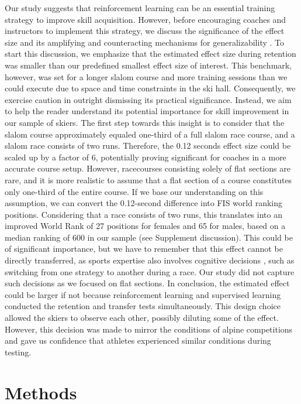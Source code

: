 \documentclass{article}
\begin{document}
Our study suggests that reinforcement learning can be an essential training strategy to improve skill acquisition. However, before encouraging coaches and instructors to implement this strategy, we discuss the significance of the effect size and its amplifying and counteracting mechanisms for generalizability \cite{anvari_not_2023}. To start this discussion, we emphasize that the estimated effect size during retention was smaller than our predefined smallest effect size of interest. This benchmark, however, was set for a longer slalom course and more training sessions than we could execute due to space and time constraints in the ski hall. Consequently, we exercise caution in outright dismissing its practical significance. Instead, we aim to help the reader understand its potential importance for skill improvement in our sample of skiers. The first step towards this insight is to consider that the slalom course approximately equaled one-third of a full slalom race course, and a slalom race consists of two runs. Therefore, the 0.12 seconds effect size could be scaled up by a factor of 6, potentially proving significant for coaches in a more accurate course setup. However, racecourses consisting solely of flat sections are rare, and it is more realistic to assume that a flat section of a course constitutes only one-third of the entire course. If we base our understanding on this assumption, we can convert the 0.12-second difference into FIS world ranking positions. Considering that a race consists of two runs, this translates into an improved World Rank of 27 positions for females and 65 for males, based on a median ranking of 600 in our sample (see Supplement discussion). This could be of significant importance, but we have to remember that this effect cannot be directly transferred, as sports expertise also involves cognitive decisions \cite{mangalam_investigating_2023, krakauer_motor_2019}, such as switching from one strategy to another during a race. Our study did not capture such decisions as we focused on flat sections. In conclusion, the estimated effect could be larger if not because reinforcement learning and supervised learning conducted the retention and transfer tests simultaneously. This design choice allowed the skiers to observe each other, possibly diluting some of the effect. However, this decision was made to mirror the conditions of alpine competitions and gave us confidence that athletes experienced similar conditions during testing. 

\section{Methods}
\end{document}
